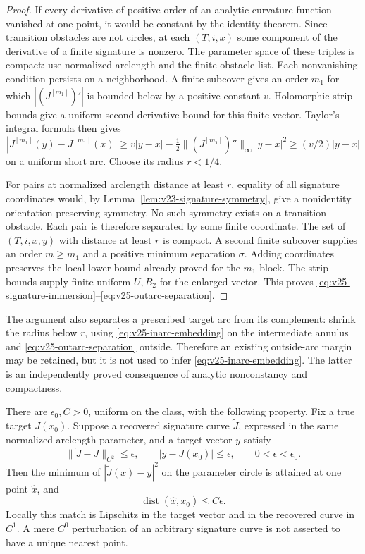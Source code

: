 \begin{proof}
If every derivative of positive order of an analytic curvature function
vanished at one point, it would be constant by the identity theorem.
Since transition obstacles are not circles, at each \((T,i,x)\) some
component of the derivative of a finite signature is nonzero.  The parameter
space of these triples is compact: use normalized arclength and the finite
obstacle list.  Each nonvanishing condition persists on a neighborhood.
A finite subcover gives an order \(m_1\) for which
\(|(J^{[m_1]})'|\) is bounded below by a positive constant \(v\).
Holomorphic strip bounds give a uniform second derivative bound for this
finite vector.  Taylor's integral formula then gives
\[
 |J^{[m_1]}(y)-J^{[m_1]}(x)|
 \ge v|y-x|-\tfrac12\|(J^{[m_1]})''\|_\infty|y-x|^2
 \ge(v/2)|y-x|
\]
on a uniform short arc.  Choose its radius \(r<1/4\).

For pairs at normalized arclength distance at least \(r\), equality of
all signature coordinates would, by
Lemma~\ref{lem:v23-signature-symmetry}, give a nonidentity
orientation-preserving symmetry.  No such symmetry exists on a transition
obstacle.  Each pair is therefore separated by some finite coordinate.
The set of \((T,i,x,y)\) with distance at least \(r\) is compact.  A
second finite subcover supplies an order \(m\ge m_1\) and a positive
minimum separation \(\sigma\).  Adding coordinates preserves the local
lower bound already proved for the \(m_1\)-block.  The strip bounds supply
finite uniform \(U,B_2\) for the enlarged vector.  This proves
\eqref{eq:v25-signature-immersion}--\eqref{eq:v25-outarc-separation}.
\end{proof}

The argument also separates a prescribed target arc from its complement:
shrink the radius below \(r\), using \eqref{eq:v25-inarc-embedding} on the
intermediate annulus and \eqref{eq:v25-outarc-separation} outside.  Therefore
an existing outside-arc margin may be retained, but it is not used to infer
\eqref{eq:v25-inarc-embedding}.  The latter is an independently proved
consequence of analytic nonconstancy and compactness.

\begin{lemma}
\label{lem:v25-noisy-signature-match}
There are \(\epsilon_0,C>0\), uniform on the class, with the following
property.  Fix a true target \(J(x_0)\).  Suppose a recovered signature
curve \(\widetilde J\), expressed in the same normalized arclength
parameter, and a target vector \(y\) satisfy
\[
 \|\widetilde J-J\|_{C^2}\le\epsilon,\qquad
 |y-J(x_0)|\le\epsilon,\qquad 0<\epsilon<\epsilon_0.
\]
Then the minimum of \(|\widetilde J(x)-y|^2\) on the parameter circle is
attained at one point \(\widehat x\), and
\begin{equation}\label{eq:v25-noisy-match-error}
                         \operatorname{dist}(\widehat x,x_0)\le C\epsilon.
\end{equation}
Locally this match is Lipschitz in the target vector and in the recovered
curve in \(C^1\).  A mere \(C^0\) perturbation of an arbitrary signature
curve is not asserted to have a unique nearest point.
\end{lemma}

